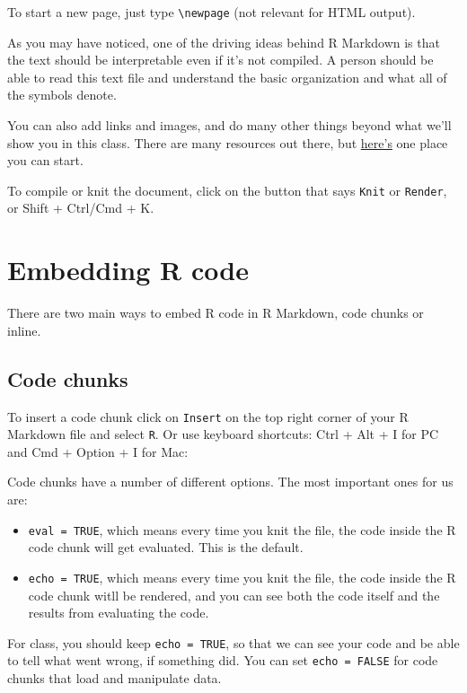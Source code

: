 \documentclass[
  letterpaper,
  DIV=11,
  numbers=noendperiod]{scrreprt}
\providecommand{\tightlist}{%
  \setlength{\itemsep}{0pt}\setlength{\parskip}{0pt}}\usepackage{longtable,booktabs,array}
\begin{document}
To start a new page, just type \texttt{\textbackslash{}newpage} (not
relevant for HTML output).

As you may have noticed, one of the driving ideas behind R Markdown is
that the text should be interpretable even if it's not compiled. A
person should be able to read this text file and understand the basic
organization and what all of the symbols denote.

You can also add links and images, and do many other things beyond what
we'll show you in this class. There are many resources out there, but
\href{https://rmarkdown.rstudio.com/lesson-1.html}{here's} one place you
can start.

To compile or knit the document, click on the button that says
\texttt{Knit} or \texttt{Render}, or Shift + Ctrl/Cmd + K.

\hypertarget{embedding-r-code}{%
\section{Embedding R code}\label{embedding-r-code}}

There are two main ways to embed R code in R Markdown, code chunks or
inline.

\hypertarget{code-chunks}{%
\subsection{Code chunks}\label{code-chunks}}

To insert a code chunk click on \texttt{Insert} on the top right corner
of your R Markdown file and select \texttt{R}. Or use keyboard
shortcuts: Ctrl + Alt + I for PC and Cmd + Option + I for Mac:

Code chunks have a number of different options. The most important ones
for us are:

\begin{itemize}
\tightlist
\item
  \texttt{eval\ =\ TRUE}, which means every time you knit the file, the
  code inside the R code chunk will get evaluated. This is the default.
\item
  \texttt{echo\ =\ TRUE}, which means every time you knit the file, the
  code inside the R code chunk witll be rendered, and you can see both
  the code itself and the results from evaluating the code.
\end{itemize}

For class, you should keep \texttt{echo\ =\ TRUE}, so that we can see
your code and be able to tell what went wrong, if something did. You can
set \texttt{echo\ =\ FALSE} for code chunks that load and manipulate
data.
\end{document}
